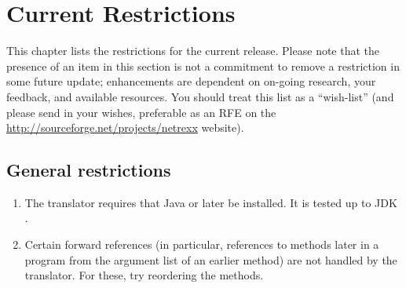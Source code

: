 \chapter{Current Restrictions}\label{restrictions}
This chapter lists the restrictions for the current release. Please note that the presence of an item in this section is not a commitment to remove a restriction in some future update; \nr{} enhancements are dependent on on-going research, your feedback, and available resources. You should treat this list as a “wish-list” (and please send in your wishes, preferable as an RFE on the \url{http://sourceforge.net/projects/netrexx} website). 
\section{General restrictions}
\begin{enumerate}
\item The translator requires that Java  \minimalJVMversion{} or later be installed. It is tested up to JDK \maximalJVMversion{}.
\item Certain forward references (in particular, references to methods later in a program from the argument list of an earlier method) are not handled by the translator. For these, try reordering the methods.
\end{enumerate}
